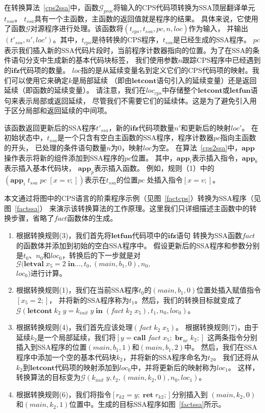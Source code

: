 在转换算法~\ref{cps2ssa}中，函数$\mathcal{G}_{proc}$将输入的CPS代码项转换为SSA顶层翻译单元$t_{ssa}$。
$t_{ssa}$具有一个主函数，主函数的返回值就是程序的结果。
具体来说，它使用了函数$\mathcal{G}$对源程序进行处理。该函数将$(t_{cps}, t_{ssa}, pc, n, loc)$作为输入，
并输出$(t'_{ssa}, n', loc')$。其中，$t_{cps}$是待转换的CPS程序，$t_{ssa}$是已经生成的SSA程序。
$pc$表示我们插入新的SSA代码片段时，当前程序计数器指向的位置。为了在SSA的条件语句分支中生成新的基本代码块标签，
我们使用参数$n$跟踪CPS程序中已经遇到的$\mathbf{ifz}$代码项的数量。
$loc$指的是从延续变量名到定义它们的CPS代码项的映射。我们可以使用它来确定$k$是局部延续
（即由$\mathbf{letcont}$语句引入的延续变量）还是返回延续（即函数的延续变量）。
请注意，我们在$loc_{cps}$中存储整个$\mathbf{letcont}$或$\mathbf{letfun}$语句来表示局部或返回延续，
尽管我们不需要它们的延续体。这是为了避免引入用于区分局部和返回延续的中间项。

该函数返回更新后的SSA程序$t'_{ssa}$，新的$\mathbf{ifz}$代码项数量$n'$和更新后的映射$loc'$。
在初始状态中，$t_{ssa}$是一个只含有空白主函数的SSA程序，程序计数器$pc$指向主函数的开头，
已处理的条件语句数量$n$为0，映射$loc$为空。
在算法~\ref{cps2ssa}中，$\mathbf{app}$操作表示将新的组件添加到SSA程序的$pc$位置。
其中，$\mathbf{app}_i$表示插入指令，$\mathbf{app}_b$表示插入基本代码块，
$\mathbf{app}_p$表示插入函数。
例如，规则（1）中的$(\mathbf{app}_i\; t_{ssa}\; pc\; [x=v;])$表示在$t_{ssa}$的位置$pc$
处插入指令$[x=v;]$。

本文通过将图中的CPS语言的阶乘程序示例（见图~\ref{factcps}）转换为SSA程序（见图~\ref{factssa}）
来演示该转换算法的工作原理。这里我们只详细描述主函数中的转换步骤，省略了$fact$函数体的生成。
\begin{enumerate}
    \item 根据转换规则(3)，我们首先将$\mathbf{letfun}$代码项中的$\mathbf{ifz}$语句
        转换为SSA函数$fact$的函数体并添加到初始的空白SSA程序中。
        假设更新后的SSA程序和参数分别是$t_0$、$n_0$和$loc_0$，转换后的下一步就是对
        $\mathcal{G}(\mathbf{letval}\; x_5=2\; \mathbf{in}\dots, t_0, (main,b_1,0), n_0,$ \\ $loc_0)$进行计算。   
    \item 根据转换规则(1)，我们在当前SSA程序$t_0$的$(main,b_1,0)$位置处插入赋值指令$[x_5=2;]$，
        并将新的SSA程序称为$t_1$。然后，我们的转换目标就变成了
        $\mathcal{G}(\mathbf{letcont}\; k_2\; y=k_{init}\; y\; \mathbf{in}\; (fact\; k_2\; x_5), t_1, n_0, loc_0)$。
    \item 根据转换规则(4)，我们首先应该处理$(fact\; k_2\; x_5)$。
        根据转换规则(7)，由于延续$k_2$是一个局部延续，我们将$[y = \mathbf{call}\; fact\; x_5;\; \mathbf{br}_{uc}\; k_2;]$
        这两条指令分别插入到SSA程序的位置$(main,b_1,1)$和$(main,b_1,2)$中。
        然后，我们在SSA程序中添加一个空的基本代码块$k_2$，并将新的SSA程序命名为$t_2$。
        我们还将从$k_2$到$\mathbf{letcont}$代码项的映射添加到$loc_0$中，并将更新后的映射称为$loc_1$。
        这样，转换算法的目标变为$\mathcal{G}(k_{init}\; y, t_2, (main,k_2,0), n_0, loc_1)$。
    \item 根据转换规则(6)，我们将指令$[r_{k2} = y;\; \mathbf{ret}\; r_{k2};]$分别插入到
        $(main,k_2,0)$和$(main,k_2,1)$位置中。生成的目标SSA程序如图~\ref{factssa}所示。
\end{enumerate}
